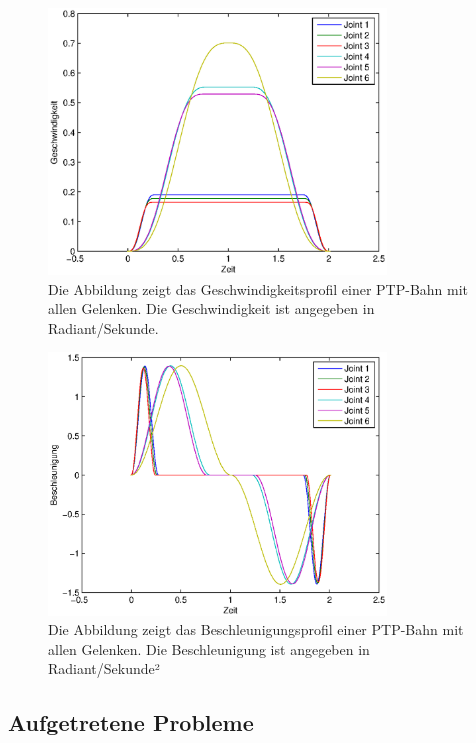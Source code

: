 \begin{figure}[H]
  \centering
    \includegraphics[width=0.8\textwidth]{pic/velocity_profile.eps}
      \caption[Geschwindigkeitsprofil einer PTP-Bahn in Matlab gepplotet]{Die Abbildung zeigt das Geschwindigkeitsprofil einer PTP-Bahn mit allen Gelenken. Die Geschwindigkeit ist angegeben in Radiant/Sekunde.}
      \label{fig:velocity_ptp_profile}
\end{figure}

\begin{figure}[H]
  \centering
    \includegraphics[width=0.8\textwidth]{pic/acceleration_profile.eps}
      \caption[Beschleunigungsprofil einer PTP-Bahn in Matlab geplottet]{Die Abbildung zeigt das Beschleunigungsprofil einer PTP-Bahn mit allen Gelenken. Die Beschleunigung ist angegeben in Radiant/Sekunde²}
      \label{fig:acceleration_ptp_profile}
\end{figure}

\subsection{Aufgetretene Probleme}
\label{sub:capi-problems_rel}

